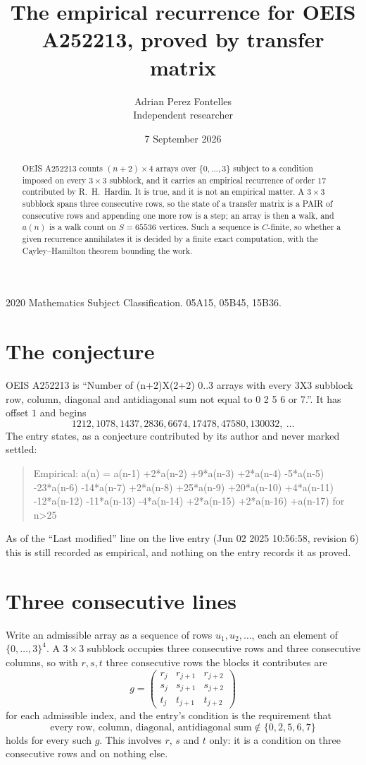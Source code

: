 \documentclass[11pt,a4paper]{article}
\title{The empirical recurrence for OEIS A252213, proved by transfer matrix}
\author{Adrian Perez Fontelles\\ \small Independent researcher}
\date{7 September 2026}
\theoremstyle{plain}
\theoremstyle{definition}
\begin{document}
\maketitle

\begin{abstract}
OEIS A252213 counts $(n+2)\times4$ arrays over $\{0,\dots,3\}$ subject to a condition imposed on
every $3\times3$ subblock, and it carries an empirical recurrence of order $17$
contributed by R.~H.~Hardin. It is true, and it is not an empirical matter. A $3\times3$
subblock spans three consecutive rows, so the state of a transfer matrix is a PAIR of
consecutive rows and appending one more row is a step; an array is then a walk, and
$a(n)$ is a walk count on $S=65536$ vertices. Such a sequence is $C$-finite, so whether a given
recurrence annihilates it is decided by a finite exact computation, with the Cayley--Hamilton
theorem bounding the work.
\end{abstract}

\noindent\small 2020 Mathematics Subject Classification. 05A15, 05B45, 15B36.\normalsize

\section{The conjecture}

OEIS A252213 is ``Number of (n+2)X(2+2) 0..3 arrays with every 3X3 subblock row, column, diagonal and antidiagonal sum not equal to 0 2 5 6 or 7.''. It has offset $1$ and begins
\[
1212, 1078, 1437, 2836, 6674, 17478, 47580, 130032,\ \dots
\]
The entry states, as a conjecture contributed by its author and never marked settled:
\begin{quote}
Empirical: a(n) = a(n-1) +2*a(n-2) +9*a(n-3) +2*a(n-4) -5*a(n-5) -23*a(n-6) -14*a(n-7) +2*a(n-8) +25*a(n-9) +20*a(n-10) +4*a(n-11) -12*a(n-12) -11*a(n-13) -4*a(n-14) +2*a(n-15) +2*a(n-16) +a(n-17) for n>25
\end{quote}
As of the ``Last modified'' line on the live entry (Jun 02 2025 10:56:58, revision 6) this is still
recorded as empirical, and nothing on the entry records it as proved.

\section{Three consecutive lines}

Write an admissible array as a sequence of rows $u_1,u_2,\dots$, each an element of
$\{0,\dots,3\}^{4}$. A $3\times3$ subblock occupies three consecutive rows and
three consecutive columns, so with $r,s,t$ three consecutive rows the blocks it
contributes are
\[
g=\begin{pmatrix}r_j&r_{j+1}&r_{j+2}\\ s_j&s_{j+1}&s_{j+2}\\ t_j&t_{j+1}&t_{j+2}\end{pmatrix}
\]
for each admissible index, and the entry's condition is the requirement that
\[
\text{every row, column, diagonal, antidiagonal sum} \notin \{0,2,5,6,7\}
\]
holds for every such $g$. This involves $r$, $s$ and $t$ only: it is a condition on
three consecutive rows and on nothing else.
\end{document}
